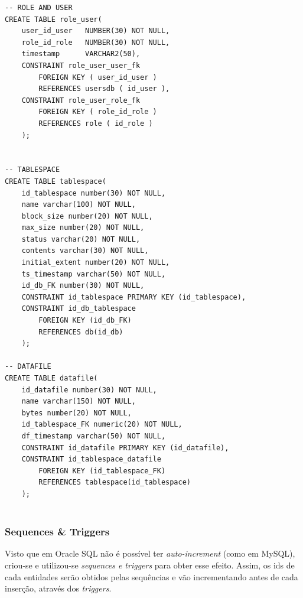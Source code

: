 \documentclass[a4paper]{article}
\begin{document}
\begin{lstlisting}
-- ROLE AND USER
CREATE TABLE role_user(
    user_id_user   NUMBER(30) NOT NULL,
    role_id_role   NUMBER(30) NOT NULL,
    timestamp      VARCHAR2(50),
    CONSTRAINT role_user_user_fk 
        FOREIGN KEY ( user_id_user )
        REFERENCES usersdb ( id_user ),
    CONSTRAINT role_user_role_fk 
        FOREIGN KEY ( role_id_role )
        REFERENCES role ( id_role )
    );


-- TABLESPACE
CREATE TABLE tablespace(
    id_tablespace number(30) NOT NULL,
    name varchar(100) NOT NULL,
    block_size number(20) NOT NULL,
    max_size number(20) NOT NULL,
    status varchar(20) NOT NULL,
    contents varchar(30) NOT NULL,
    initial_extent number(20) NOT NULL,
    ts_timestamp varchar(50) NOT NULL,
    id_db_FK number(30) NOT NULL,
    CONSTRAINT id_tablespace PRIMARY KEY (id_tablespace),
    CONSTRAINT id_db_tablespace
        FOREIGN KEY (id_db_FK)
        REFERENCES db(id_db)
    );

-- DATAFILE
CREATE TABLE datafile(
    id_datafile number(30) NOT NULL,
    name varchar(150) NOT NULL,
    bytes number(20) NOT NULL,
    id_tablespace_FK numeric(20) NOT NULL,
    df_timestamp varchar(50) NOT NULL,
    CONSTRAINT id_datafile PRIMARY KEY (id_datafile),
    CONSTRAINT id_tablespace_datafile
        FOREIGN KEY (id_tablespace_FK)
        REFERENCES tablespace(id_tablespace)
    );
                    
\end{lstlisting}

\subsubsection{Sequences \& Triggers}

Visto que em Oracle SQL não é possível ter \emph{auto-increment} (como em MySQL), criou-se e utilizou-se \emph{sequences e triggers} para obter esse efeito. Assim, os ids de cada entidades serão obtidos pelas sequências e vão incrementando antes de cada inserção, através dos \emph{triggers}.
\end{document}
